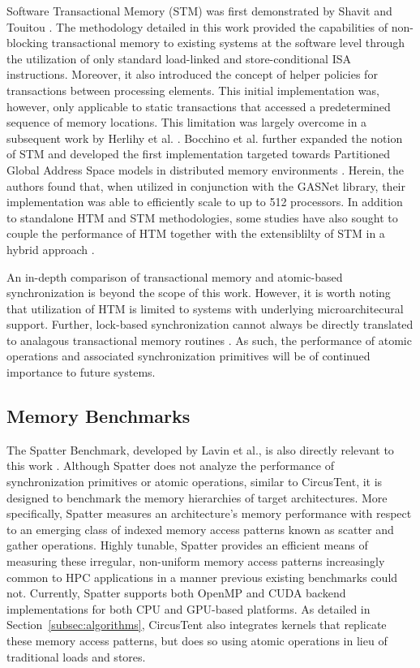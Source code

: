 Software Transactional Memory (STM) was first demonstrated by Shavit and Touitou \cite{shavit1995softwaretm}.
The methodology detailed in this work provided the capabilities of non-blocking transactional memory to existing systems at the software level through the utilization of only standard load-linked and store-conditional ISA instructions.
Moreover, it also introduced the concept of helper policies for transactions between processing elements.
This initial implementation was, however, only applicable to static transactions that accessed a predetermined sequence of memory locations.
This limitation was largely overcome in a subsequent work by Herlihy et al. \cite{herlihy2003stmdsds}.
Bocchino et al. further expanded the notion of STM and developed the first implementation targeted towards Partitioned Global Address Space models in distributed memory environments \cite{bocchino2008stm}.
Herein, the authors found that, when utilized in conjunction with the GASNet library, their implementation was able to efficiently scale to up to 512 processors.
In addition to standalone HTM and STM methodologies, some studies have also sought to couple the performance of HTM together with the extensiblilty of STM in a hybrid approach \cite{baugh2008using}.

An in-depth comparison of transactional memory and atomic-based synchronization is beyond the scope of this work.
However, it is worth noting that utilization of HTM is limited to systems with underlying microarchitecural support.
Further, lock-based synchronization cannot always be directly translated to analagous transactional memory routines \cite{blundell2006subtleties}.
As such, the performance of atomic operations and associated synchronization primitives will be of continued importance to future systems.

\subsection{Memory Benchmarks}
\label{subsec:memory_bench}

The Spatter Benchmark, developed by Lavin et al., is also directly relevant to this work \cite{lavin2018spatter}.
Although Spatter does not analyze the performance of synchronization primitives or atomic operations, similar to CircusTent, it is designed to benchmark the memory hierarchies of target architectures.
More specifically, Spatter measures an architecture's memory performance with respect to an emerging class of indexed memory access patterns known as scatter and gather operations.
Highly tunable, Spatter provides an efficient means of measuring these irregular, non-uniform memory access patterns increasingly common to HPC applications in a manner previous existing benchmarks could not.
Currently, Spatter supports both OpenMP and CUDA backend implementations for both CPU and GPU-based platforms.
As detailed in Section~\ref{subsec:algorithms}, CircusTent also integrates kernels that replicate these memory access patterns, but does so using atomic operations in lieu of traditional loads and stores.

